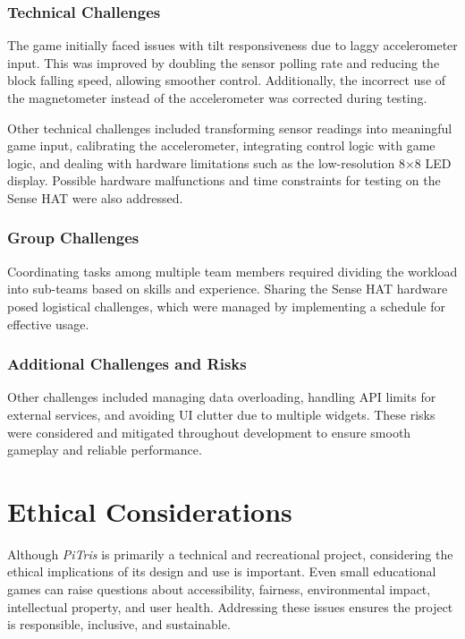 \documentclass[12pt]{report}
\begin{document}
\subsection{Technical Challenges}

The game initially faced issues with tilt responsiveness due to laggy accelerometer input. This was improved by doubling the sensor polling rate and reducing the block falling speed, allowing smoother control. Additionally, the incorrect use of the magnetometer instead of the accelerometer was corrected during testing.  

Other technical challenges included transforming sensor readings into meaningful game input, calibrating the accelerometer, integrating control logic with game logic, and dealing with hardware limitations such as the low-resolution 8$\times$8 LED display. Possible hardware malfunctions and time constraints for testing on the Sense HAT were also addressed.

\subsection{Group Challenges}

Coordinating tasks among multiple team members required dividing the workload into sub-teams based on skills and experience. Sharing the Sense HAT hardware posed logistical challenges, which were managed by implementing a schedule for effective usage.

\subsection{Additional Challenges and Risks}

Other challenges included managing data overloading, handling API limits for external services, and avoiding UI clutter due to multiple widgets. These risks were considered and mitigated throughout development to ensure smooth gameplay and reliable performance.

\chapter{Ethical Considerations}

Although \textit{PiTris} is primarily a technical and recreational project, considering the ethical implications of its design and use is important. Even small educational games can raise questions about accessibility, fairness, environmental impact, intellectual property, and user health. Addressing these issues ensures the project is responsible, inclusive, and sustainable.
\end{document}
